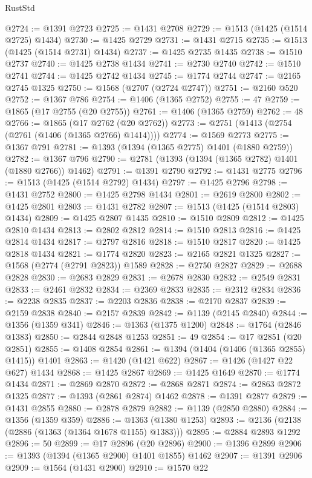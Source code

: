 \begin{lexlean}{RustStd}
\begin{coremodule}
@2724 := @1391 @2723
@2725 := @1431 @2708
@2729 := @1513 (@1425 (@1514 @2725) @1434)
@2730 := @1425 @2729
@2731 := @1431 @2715
@2735 := @1513 (@1425 (@1514 @2731) @1434)
@2737 := @1425 @2735 @1435
@2738 := @1510 @2737
@2740 := @1425 @2738 @1434
@2741 := @2730 @2740
@2742 := @1510 @2741
@2744 := @1425 @2742 @1434
@2745 := @1774 @2744
@2747 := @2165 @2745 @1325
@2750 := @1568 (@2707 (@2724 @2747))
@2751 := @2160 @520
@2752 := @1367 @786
@2754 := @1406 (@1365 @2752)
@2755 := 47
@2759 := @1865 (@17 @2755 (@20 @2755))
@2761 := @1406 (@1365 @2759)
@2762 := 48
@2766 := @1865 (@17 @2762 (@20 @2762))
@2773 := @2751 (@1413 (@2754 (@2761 (@1406 (@1365 @2766) @1414))))
@2774 := @1569 @2773
@2775 := @1367 @791
@2781 := @1393 (@1394 (@1365 @2775) @1401 (@1880 @2759))
@2782 := @1367 @796
@2790 := @2781 (@1393 (@1394 (@1365 @2782) @1401 (@1880 @2766)) @1462)
@2791 := @1391 @2790
@2792 := @1431 @2775
@2796 := @1513 (@1425 (@1514 @2792) @1434)
@2797 := @1425 @2796
@2798 := @1431 @2752
@2800 := @1425 @2798 @1434
@2801 := @2619 @2800
@2802 := @1425 @2801
@2803 := @1431 @2782
@2807 := @1513 (@1425 (@1514 @2803) @1434)
@2809 := @1425 @2807 @1435
@2810 := @1510 @2809
@2812 := @1425 @2810 @1434
@2813 := @2802 @2812
@2814 := @1510 @2813
@2816 := @1425 @2814 @1434
@2817 := @2797 @2816
@2818 := @1510 @2817
@2820 := @1425 @2818 @1434
@2821 := @1774 @2820
@2823 := @2165 @2821 @1325
@2827 := @1568 (@2774 (@2791 @2823)) @1589
@2828 := @2750 @2827
@2829 := @2688 @2828
@2830 := @2683 @2829
@2831 := @2678 @2830
@2832 := @2549 @2831
@2833 := @2461 @2832
@2834 := @2369 @2833
@2835 := @2312 @2834
@2836 := @2238 @2835
@2837 := @2203 @2836
@2838 := @2170 @2837
@2839 := @2159 @2838
@2840 := @2157 @2839
@2842 := @1139 (@2145 @2840)
@2844 := @1356 (@1359 @341)
@2846 := @1363 (@1375 @1200)
@2848 := @1764 (@2846 @1383)
@2850 := @2844 @2848 @1253
@2851 := 49
@2854 := @17 @2851 (@20 @2851)
@2855 := @1408 @2854
@2861 := @1394 (@1404 (@1406 (@1365 @2855) @1415)) @1401
@2863 := @1420 (@1421 @622)
@2867 := @1426 (@1427 @22 @627) @1434
@2868 := @1425 @2867
@2869 := @1425 @1649
@2870 := @1774 @1434
@2871 := @2869 @2870
@2872 := @2868 @2871
@2874 := @2863 @2872 @1325
@2877 := @1393 (@2861 @2874) @1462
@2878 := @1391 @2877
@2879 := @1431 @2855
@2880 := @2878 @2879
@2882 := @1139 (@2850 @2880)
@2884 := @1356 (@1359 @359)
@2886 := @1363 (@1380 @1253)
@2893 := @2136 (@2138 (@2886 (@1363 (@1364 @1678 @1155) @1383)))
@2895 := @2884 @2893 @1292
@2896 := 50
@2899 := @17 @2896 (@20 @2896)
@2900 := @1396 @2899
@2906 := @1393 (@1394 (@1365 @2900) @1401 @1855) @1462
@2907 := @1391 @2906
@2909 := @1564 (@1431 @2900)
@2910 := @1570 @22

\end{coremodule}
\end{lexlean}
